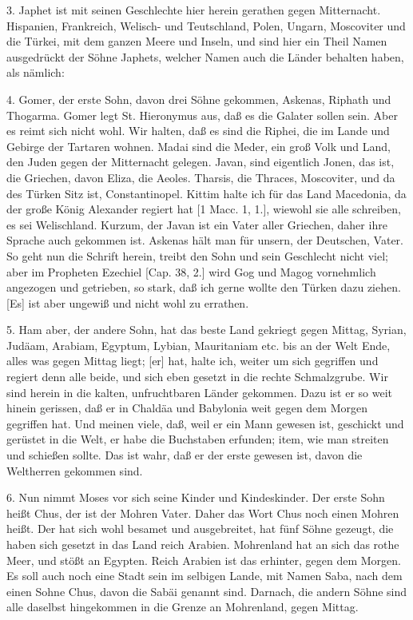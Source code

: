 3. Japhet ist mit seinen Geschlechte hier herein gerathen gegen Mitternacht. Hispanien, Frankreich, Welisch- und Teutschland, Polen, Ungarn, Moscoviter und die Türkei, mit dem ganzen Meere und Inseln, und sind hier ein Theil Namen ausgedrückt der Söhne Japhets, welcher Namen auch die Länder behalten haben, als nämlich:

4. Gomer, der erste Sohn, davon drei Söhne gekommen, Askenas, Riphath und Thogarma. Gomer legt St. Hieronymus aus, daß es die Galater sollen sein. Aber es reimt sich nicht wohl. Wir halten, daß es sind die Riphei, die im Lande und Gebirge der Tartaren wohnen. Madai sind die Meder, ein groß Volk und Land, den Juden gegen der Mitternacht gelegen. Javan, sind eigentlich Jonen, das ist, die Griechen, davon Eliza, die Aeoles. Tharsis, die Thraces, Moscoviter, und da des Türken Sitz ist, Constantinopel. Kittim halte ich für das Land Macedonia, da der große König Alexander regiert hat [1 Macc. 1, 1.], wiewohl sie alle schreiben, es sei Welischland. Kurzum, der Javan ist ein Vater aller Griechen, daher ihre Sprache auch gekommen ist. Askenas hält man für unsern, der Deutschen, Vater. So geht nun die Schrift herein, treibt den Sohn und sein Geschlecht nicht viel; aber im Propheten Ezechiel [Cap. 38, 2.] wird Gog und Magog vornehmlich angezogen und getrieben, so stark, daß ich gerne wollte den Türken dazu ziehen. [Es] ist aber ungewiß und nicht wohl zu errathen.

5. Ham aber, der andere Sohn, hat das beste Land gekriegt gegen Mittag, Syrian, Judäam, Arabiam, Egyptum, Lybian, Mauritaniam etc. bis an der Welt Ende, alles was gegen Mittag liegt; [er] hat, halte ich, weiter um sich gegriffen und regiert denn alle beide, und sich eben gesetzt in die rechte Schmalzgrube. Wir
sind herein in die kalten, unfruchtbaren Länder gekommen. Dazu ist er so weit hinein gerissen, daß er in Chaldäa und Babylonia weit gegen dem Morgen gegriffen hat. Und meinen viele, daß, weil er ein Mann gewesen ist, geschickt und gerüstet in die Welt, er habe die Buchstaben erfunden; item, wie man streiten und schießen sollte. Das ist wahr, daß er der erste gewesen ist, davon die Weltherren gekommen sind.

6. Nun nimmt Moses vor sich seine Kinder und Kindeskinder. Der erste Sohn heißt Chus, der ist der Mohren Vater. Daher das Wort Chus noch einen Mohren heißt. Der hat sich wohl besamet und ausgebreitet, hat fünf Söhne gezeugt, die haben sich gesetzt in das Land reich Arabien. Mohrenland hat an sich das rothe Meer, und stößt an Egypten. Reich Arabien ist das erhinter, gegen dem Morgen. Es soll auch noch eine Stadt sein im selbigen Lande, mit Namen Saba, nach dem einen Sohne Chus, davon die Sabäi genannt sind. Darnach, die andern Söhne sind alle daselbst hingekommen in die Grenze an Mohrenland, gegen Mittag.

